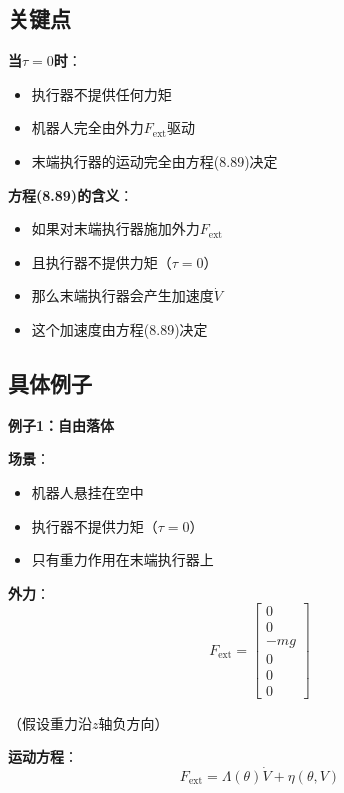 \documentclass[12pt,a4paper]{article}
\begin{document}
\subsection{关键点}

\textbf{当$\tau = 0$时}：
\begin{itemize}
\item 执行器不提供任何力矩
\item 机器人完全由外力$F_{\text{ext}}$驱动
\item 末端执行器的运动完全由方程(8.89)决定
\end{itemize}

\textbf{方程(8.89)的含义}：
\begin{itemize}
\item 如果对末端执行器施加外力$F_{\text{ext}}$
\item 且执行器不提供力矩（$\tau = 0$）
\item 那么末端执行器会产生加速度$\dot{V}$
\item 这个加速度由方程(8.89)决定
\end{itemize}

\subsection{具体例子}

\textbf{例子1：自由落体}

\textbf{场景}：
\begin{itemize}
\item 机器人悬挂在空中
\item 执行器不提供力矩（$\tau = 0$）
\item 只有重力作用在末端执行器上
\end{itemize}

\textbf{外力}：
\begin{equation}
F_{\text{ext}} = \begin{bmatrix} 0 \\ 0 \\ -mg \\ 0 \\ 0 \\ 0 \end{bmatrix}
\end{equation}

（假设重力沿$z$轴负方向）

\textbf{运动方程}：
\begin{equation}
F_{\text{ext}} = \Lambda(\theta)\dot{V} + \eta(\theta, V)
\end{equation}
\end{document}
